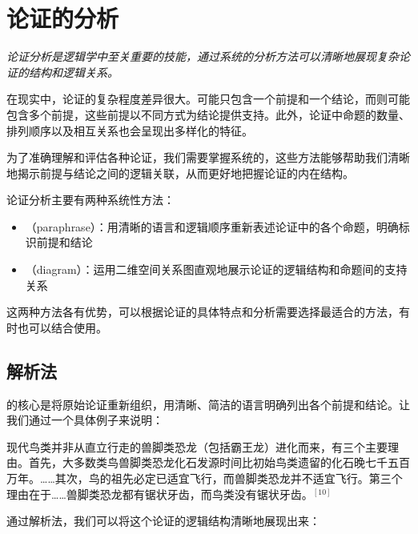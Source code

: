 \section{论证的分析}

\begin{logicbox}[title=引言]
\textit{论证分析是逻辑学中至关重要的技能，通过系统的分析方法可以清晰地展现复杂论证的结构和逻辑关系。}
\end{logicbox}

在现实中，论证的复杂程度差异很大。可能只包含一个前提和一个结论，而则可能包含多个前提，这些前提以不同方式为结论提供支持。此外，论证中命题的数量、排列顺序以及相互关系也会呈现出多样化的特征。

为了准确理解和评估各种论证，我们需要掌握系统的，这些方法能够帮助我们清晰地揭示前提与结论之间的逻辑关联，从而更好地把握论证的内在结构。

\begin{theorembox}[title=两种主要分析方法]
论证分析主要有两种系统性方法：
\begin{itemize}
  \item {}（paraphrase）：用清晰的语言和逻辑顺序重新表述论证中的各个命题，明确标识前提和结论
  \item {}（diagram）：运用二维空间关系图直观地展示论证的逻辑结构和命题间的支持关系
\end{itemize}

这两种方法各有优势，可以根据论证的具体特点和分析需要选择最适合的方法，有时也可以结合使用。
\end{theorembox}

\subsection{解析法}

的核心是将原始论证重新组织，用清晰、简洁的语言明确列出各个前提和结论。让我们通过一个具体例子来说明：

\begin{examplebox}[title=原始论证]
现代鸟类并非从直立行走的兽脚类恐龙（包括霸王龙）进化而来，有三个主要理由。首先，大多数类鸟兽脚类恐龙化石发源时间比初始鸟类遗留的化石晚七千五百万年。……其次，鸟的祖先必定已适宜飞行，而兽脚类恐龙并不适宜飞行。第三个理由在于……兽脚类恐龙都有锯状牙齿，而鸟类没有锯状牙齿。${}^{[10]}$
\end{examplebox}

通过解析法，我们可以将这个论证的逻辑结构清晰地展现出来：

